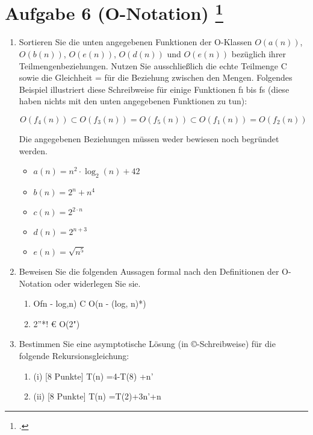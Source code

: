 \documentclass{lehramt-informatik-aufgabe}
\begin{document}
\section{Aufgabe 6 (O-Notation)
\footcite{66115:2019:09}}

\begin{enumerate}


\item Sortieren Sie die unten angegebenen Funktionen der
O-Klassen $O(a(n))$, $O(b(n))$, $O(e(n))$, $O(d(n))$ und $O(e(n))$
bezüglich ihrer Teilmengenbeziehungen. Nutzen Sie ausschließlich die
echte Teilmenge C sowie die Gleichheit = für die Beziehung zwischen den
Mengen. Folgendes Beispiel illustriert diese Schreibweise für einige
Funktionen fı bis fs (diese haben nichts mit den unten angegebenen
Funktionen zu tun):

\begin{displaymath}
O(f_4 (n)) \subset O(f_3(n)) = O(f_5(n)) \subset O(f_1(n)) = O(f_2(n))
\end{displaymath}

Die angegebenen Beziehungen müssen weder bewiesen noch begründet werden.

\begin{itemize}
\item $a(n) = n^2 \cdot \log_2(n) + 42$
\item $b(n) = 2^n + n^4$
\item $c(n) = 2^{2 \cdot n}$
\item $d(n) = 2^{n+3}$
\item $e(n) = \sqrt{n^5}$
\end{itemize}


\item Beweisen Sie die folgenden Aussagen formal nach den Definitionen
der O-Notation oder widerlegen Sie sie.

\begin{enumerate}


\item Ofn - log,n) C O(n - (log, n)*)


\item 2”*! € O(2")
\end{enumerate}


\item Bestimmen Sie eine asymptotische Lösung (in ©-Schreibweise) für
die folgende Rekursionsgleichung:

\begin{enumerate}


\item (i) [8 Punkte] T(n) =4-T(8) +n’


\item (ii) [8 Punkte] T(n) =T(2)+3n’+n
\end{enumerate}

\end{enumerate}
\end{document}
